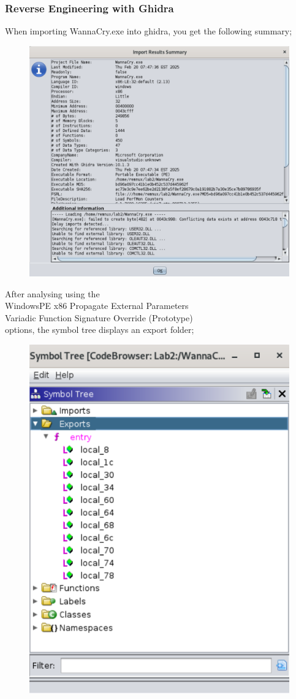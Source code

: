 \documentclass[]{project_plan}
\begin{document}
\subsubsection{Reverse Engineering with Ghidra}
When importing WannaCry.exe into ghidra, you get the following summary;
\begin{figure}[H]
  \centering
  \includegraphics[width=\linewidth]{lab2_ghidraSummary.png}
\end{figure}

After analysing using the \\
WindowsPE x86 Propagate External Parameters\\
Variadic Function Signature Override (Prototype)\\
options, the symbol tree displays an export folder;

\begin{figure}[H]
  \centering
  \includegraphics[width=.5\linewidth]{lab2 ghidra tree.png}
\end{figure}
\end{document}
